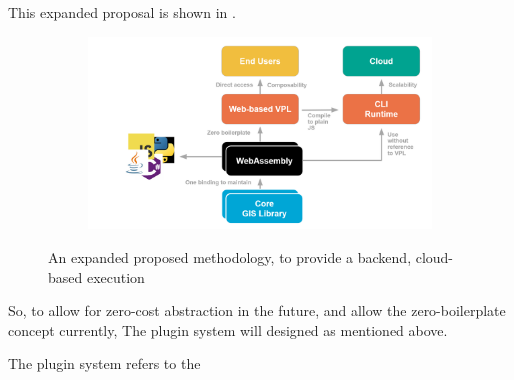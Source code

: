 This expanded proposal is shown in .




\begin{figure}
  \centering
  \begin{subfigure}[b]{0.80\linewidth}
    \centering
    \graphicspath{{../../assets/images/1/}}
    \includegraphics[width=\linewidth]{expanded-proposal.png}
  \end{subfigure}%
  \caption{An expanded proposed methodology, to provide a backend, cloud-based execution}
  \label{fig:proposal-extended}
\end{figure}






So, to allow for zero-cost abstraction in the future, and allow the zero-boilerplate concept currently, The plugin system will designed as mentioned above. 




The plugin system refers to the 




